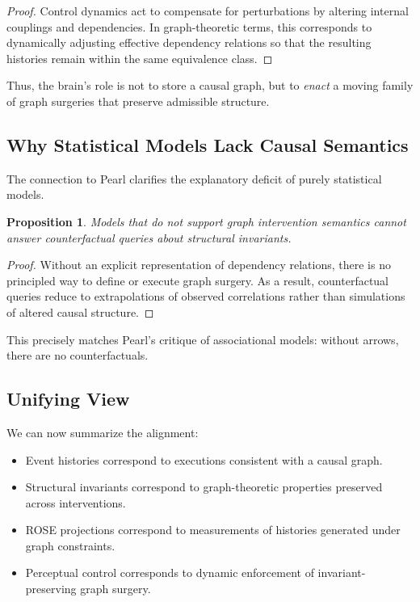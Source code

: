 \documentclass[11pt]{article}
\newtheorem{proposition}{Proposition}
\begin{document}
\begin{proof}
Control dynamics act to compensate for perturbations by altering internal couplings and dependencies. In graph-theoretic terms, this corresponds to dynamically adjusting effective dependency relations so that the resulting histories remain within the same equivalence class.
\end{proof}

Thus, the brain’s role is not to store a causal graph, but to \emph{enact} a moving family of graph surgeries that preserve admissible structure.

\subsection{Why Statistical Models Lack Causal Semantics}

The connection to Pearl clarifies the explanatory deficit of purely statistical models.

\begin{proposition}
Models that do not support graph intervention semantics cannot answer counterfactual queries about structural invariants.
\end{proposition}

\begin{proof}
Without an explicit representation of dependency relations, there is no principled way to define or execute graph surgery. As a result, counterfactual queries reduce to extrapolations of observed correlations rather than simulations of altered causal structure.
\end{proof}

This precisely matches Pearl’s critique of associational models: without arrows, there are no counterfactuals.

\subsection{Unifying View}

We can now summarize the alignment:

\begin{itemize}
  \item Event histories correspond to executions consistent with a causal graph.
  \item Structural invariants correspond to graph-theoretic properties preserved across interventions.
  \item ROSE projections correspond to measurements of histories generated under graph constraints.
  \item Perceptual control corresponds to dynamic enforcement of invariant-preserving graph surgery.
\end{itemize}
\end{document}
